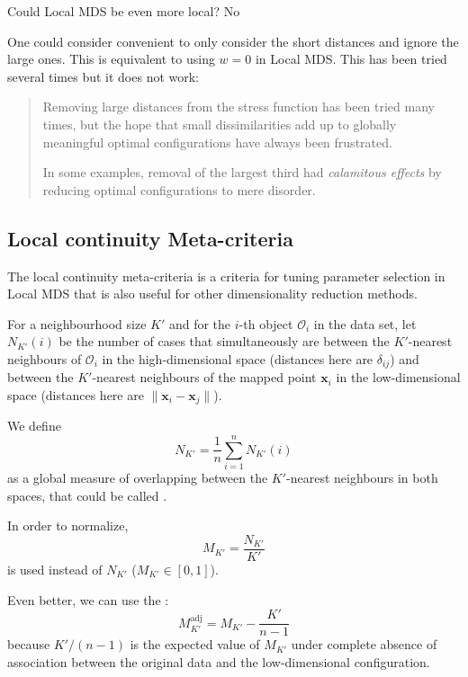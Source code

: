 \begin{question}{Could Local MDS be even more local?}{} No

	One could consider convenient to only consider the short distances and ignore
	the large ones. This is equivalent to using $w = 0$ in Local MDS. This has been
	tried several times but it does not work:
    \tcblower
	\begin{quote}
		Removing large distances from the stress function has been tried
		many times, but the hope that small dissimilarities add up to globally
		meaningful optimal configurations have always been frustrated.

		In some examples, removal of the largest third had \emph{calamitous
        effects} by reducing optimal configurations to mere disorder.
	\end{quote}
\end{question}

\subsection{Local continuity Meta-criteria}

The local continuity meta-criteria is a criteria for tuning parameter
selection in Local MDS that is also useful for other
dimensionality reduction methods.

For a neighbourhood size $K'$ and for the $i$-th object $\mathcal O_i$ in the
data set, let $N_{K'}(i)$ be the number of cases that simultaneously are between
the $K'$-nearest neighbours of $\mathcal O_i$ in the high-dimensional space
(distances here are $\delta_{ij}$) and between the $K'$-nearest neighbours of
the mapped point $\boldsymbol x_i$ in the low-dimensional space (distances here
are $\lVert \boldsymbol x_i - \boldsymbol x_j \rVert$).

We define
\begin{equation*}
	N_{K'} = \frac{1}{n} \sum_{i=1}^n N_{K'}(i)
\end{equation*}
as a global measure of overlapping between the $K'$-nearest neighbours in
both spaces, that could be called .

In order to normalize,
\begin{equation*}
	M_{K'} = \frac{N_{K'}}{K'}
\end{equation*}
is used instead of $N_{K'}$ ($M_{K'} \in [0, 1]$).

Even better, we can use the :
\begin{equation*}
	M_{K'}^{\text{adj}} = M_{K'} - \frac{K'}{n - 1}
\end{equation*}
because $K'/(n-1)$ is the expected value of $M_{K'}$ under complete
absence of association between the original data and the low-dimensional
configuration.

